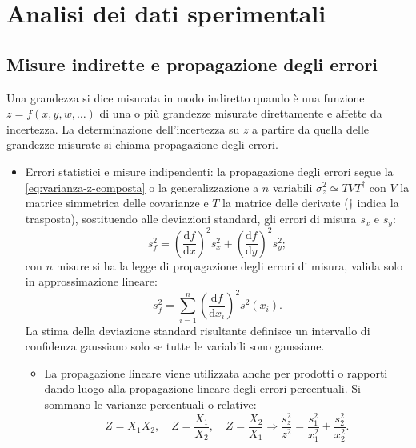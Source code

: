 \chapter{Analisi dei dati sperimentali} %
\section{Misure indirette e propagazione degli errori} %
\label{sec:misure-indirette-propagazione-errori}
Una grandezza si dice misurata in modo indiretto quando è una funzione $z=f(x,y,w,\dots)$ di una o più grandezze misurate direttamente e affette da incertezza. La determinazione dell'incertezza su $z$ a partire da quella delle grandezze misurate si chiama propagazione degli errori.
\begin{itemize}
\item Errori statistici e misure indipendenti: la propagazione degli errori segue la \ref{eq:varianza-z-composta} o la generalizzazione a $n$ variabili $\sigma ^{ 2 }_{ z }\simeq TVT^{ \dagger }$ con $V$ la matrice simmetrica delle covarianze e $T$ la matrice delle derivate ($\dagger$ indica la trasposta), sostituendo alle deviazioni standard, gli errori di misura $s_x$ e $s_y$:
\begin{equation}
\label{eq:prop-errore-statistico}
{ s }_{ f }^{ 2 }={ \left( \frac { \textrm{d}f }{ \textrm{d}x }  \right)  }^{ 2 }{ s }_{ x }^{ 2 }+{ \left( \frac { \textrm{d}f }{ \textrm{d}y }  \right)  }^{ 2 }{ s }_{ y }^{ 2 };
\end{equation}
con $n$ misure si ha la legge di propagazione degli errori di misura, valida solo in approssimazione lineare:
\begin{equation}
{ s }_{ f }^{ 2 }=\sum _{ i=1 }^{ n }{ { \left( \frac { \textrm{d}f }{ \textrm{d}{ x }_{ i } }  \right)  }^{ 2 }{ s }^{ 2 }\left( { x }_{ i } \right)  } .
\end{equation}
La stima della deviazione standard risultante definisce un intervallo di confidenza gaussiano solo se tutte le variabili sono gaussiane.
\begin{itemize}
\item La propagazione lineare viene utilizzata anche per prodotti o rapporti dando luogo alla propagazione lineare degli errori percentuali. Si sommano le varianze percentuali o relative:
\begin{equation}
Z=X_{ 1 }X_{ 2 },\quad Z=\frac { X_{ 1 } }{ X_{ 2 } } ,\quad Z=\frac { X_{ 2 } }{ X_{ 1 } } \Longrightarrow \frac { { s }_{ z }^{ 2 } }{ z^{ 2 } } =\frac { { s }_{ 1 }^{ 2 } }{ { x }_{ 1 }^{ 2 } } +\frac { { s }_{ 2 }^{ 2 } }{ { x }_{ 2 }^{ 2 } } .

\end{equation}
\end{itemize}
\end{itemize}
